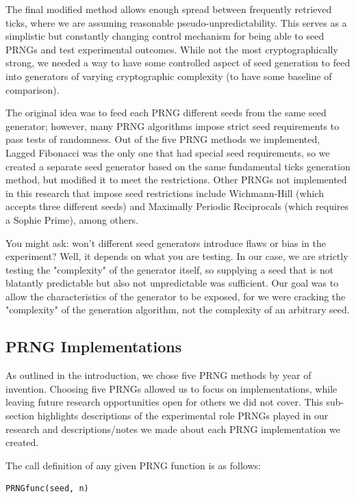 \documentclass[conference]{IEEEtran}
\begin{document}
The final modified method allows enough spread between frequently retrieved ticks, where we are assuming reasonable pseudo-unpredictability. This serves as a simplistic but constantly changing control mechanism for being able to seed PRNGs and test experimental outcomes. While not the most cryptographically strong, we needed a way to have some controlled aspect of seed generation to feed into generators of varying cryptographic complexity (to have some baseline of comparison).

The original idea was to feed each PRNG different seeds from the same seed generator; however, many PRNG algorithms impose strict seed requirements to pass tests of randomness. Out of the five PRNG methods we implemented, Lagged Fibonacci was the only one that had special seed requirements, so we created a separate seed generator based on the same fundamental ticks generation method, but modified it to meet the restrictions. Other PRNGs not implemented in this research that impose seed restrictions include Wichmann-Hill (which accepts three different seeds) and Maximally Periodic Reciprocals (which requires a Sophie Prime), among others.

You might ask: won't different seed generators introduce flaws or bias in the experiment? Well, it depends on what you are testing. In our case, we are strictly testing the "complexity" of the generator itself, so supplying a seed that is not blatantly predictable but also not unpredictable was sufficient. Our goal was to allow the characteristics of the generator to be exposed, for we were cracking the "complexity" of the generation algorithm, not the complexity of an arbitrary seed.

\subsection{PRNG Implementations}
As outlined in the introduction, we chose five PRNG methods by year of invention. Choosing five PRNGs allowed us to focus on implementations, while leaving future research opportunities open for others we did not cover. This sub-section highlights descriptions of the experimental role PRNGs played in our research and descriptions/notes we made about each PRNG implementation we created.

The call definition of any given PRNG function is as follows:
\begin{lstlisting}
PRNGfunc(seed, n) 
\end{lstlisting}
\end{document}
